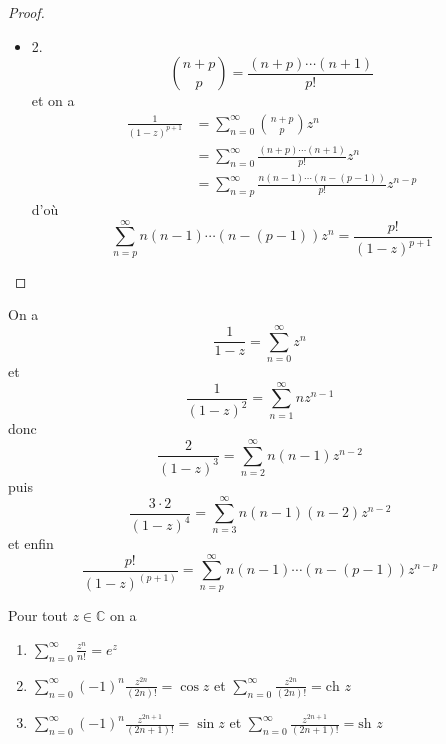 \documentclass[11pt,hidelinks]{book}
\theoremstyle{mytheoremstyle}
\theoremstyle{mytheoremstyle}
\theoremstyle{mytheoremstyle}
\theoremstyle{mytheoremstyle}
\theoremstyle{mytheoremstyle}
\theoremstyle{mytheoremstyle}
\theoremstyle{mytheoremstyle}
\theoremstyle{mytheoremstyle}
\theoremstyle{myproblemstyle}
\def\mbb#1{\mathbb{#1}}
\def\bC{\mbb{C}}
\def\is#1{\sum_{n=0}^\infty #1}
\def\iss#1#2{\sum_{n=#1}^\infty #2}
\begin{document}
\begin{adjustwidth}{-2em}{-1em}
\begin{prop}
\begin{proof}
\begin{itemize}[label=$\cdot$]
            \item 2. 
            \begin{equation*}
                \binom{n+p}{p} = \frac{(n+p)\cdots (n+1)}{p!}
            \end{equation*}
            et on a 
            \begin{align*}
                \frac{1}{(1-z)^{p+1}} &= \is{\binom{n+p}{p}z^n} \\ 
                &= \is{\frac{(n+p)\cdots (n+1)}{p!}z^n} \\ 
                &= \iss{p}{\frac{n(n-1)\cdots (n-(p-1))}{p!}z^{n-p}}
            \end{align*}
            d'où 
            \begin{equation*}
            \iss{p}{n(n-1)\cdots (n-(p-1))z^n} = \frac{p!}{(1-z)^{p+1}}
            \end{equation*}
        \end{itemize}
        \end{proof}
    \end{prop}
    \begin{rmq}
        On a
        \begin{equation*}
        \frac{1}{1-z} = \is{z^n}
        \end{equation*} 
        et
        \begin{equation*}
            \frac{1}{(1-z)^2} = \iss{1}{nz^{n-1}}
        \end{equation*}
        donc 
        \begin{equation*}
            \frac{2}{(1-z)^3} = \iss{2}{n(n-1)z^{n-2}}
        \end{equation*}
        puis 
        \begin{equation*}
            \frac{3 \cdot 2}{(1-z)^4} = \iss{3}{n(n-1)(n-2)z^{n-2}}
        \end{equation*}
        et enfin 
        \begin{equation*}
            \frac{p!}{(1-z)^(p+1)} = \iss{p}{n(n-1)\cdots (n-(p-1))z^{n-p}}
        \end{equation*}
    \end{rmq}
    \begin{prop}
        Pour tout $z \in \bC$ on a 
        \begin{enumerate}
            \item $\is{\frac{z^n}{n!}} = e^z$ 
            \item $\is{(-1)^n \frac{z^{2n}}{(2n)!}} = \cos z$ et $\is{\frac{z^{2n}}{(2n)!}} = \text{ch } z$
            \item $\is{(-1)^n \frac{z^{2n+1}}{(2n+1)!}} = \sin z$ et $\is{\frac{z^{2n+1}}{(2n+1)!}} = \text{sh } z$
        \end{enumerate}
    \end{prop}
\end{adjustwidth}
\end{document}

